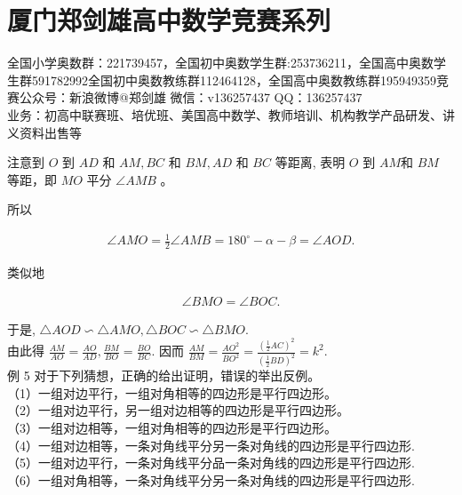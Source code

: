 \documentclass[10pt]{article}
\begin{document}
\section*{厦门郑剑雄高中数学竞赛系列}
全国小学奥数群：221739457，全国初中奥数学生群:253736211，全国高中奥数学生群591782992全国初中奥数教练群112464128，全国高中奥数教练群195949359竞赛公众号：新浪微博@郑剑雄 微信：v136257437 QQ：136257437\\
业务：初高中联赛班、培优班、美国高中数学、教师培训、机构教学产品研发、讲义资料出售等

注意到 $O$ 到 $A D$ 和 $A M, B C$ 和 $B M, A D$ 和 $B C$ 等距离, 表明 $O$ 到 $A M$和 $B M$ 等距，即 $M O$ 平分 $\angle A M B$ 。

所以

\begin{align*}
\angle A M O=\frac{1}{2} \angle A M B=180^{\circ}-\alpha-\beta=\angle A O D .
\end{align*}

类似地

\begin{align*}
\angle B M O=\angle B O C .
\end{align*}

于是, $\triangle A O D \backsim \triangle A M O, \triangle B O C \backsim \triangle B M O$.\\
由此得 $\frac{A M}{A O}=\frac{A O}{A D}, \frac{B M}{B O}=\frac{B O}{B C}$. 因而 $\frac{A M}{B M}=\frac{A O^{2}}{B O^{2}}=\frac{\left(\frac{1}{2} A C\right)^{2}}{\left(\frac{1}{2} B D\right)^{2}}=k^{2}$.\\
例 5 对于下列猜想，正确的给出证明，错误的举出反例。\\
（1）一组对边平行，一组对角相等的四边形是平行四边形。\\
（2）一组对边平行，另一组对边相等的四边形是平行四边形。\\
（3）一组对边相等，一组对角相等的四边形是平行四边形。\\
（4）一组对边相等，一条对角线平分另一条对角线的四边形是平行四边形.\\
（5）一组对边平行，一条对角线平分品一条对角线的四边形是平行四边形.\\
（6）一组对角相等，一条对角线平分另一条对角线的四边形是平行四边形.
\end{document}
